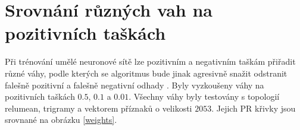 \section{Srovnání různých vah na pozitivních taškách}
Při trénování umělé neuronové sítě lze pozitivním a negativním taškám přiřadit různé váhy, podle kterých se algoritmus bude jinak agresivně snažit odstranit falešně pozitivní a falešně negativní odhady . Byly vyzkoušeny váhy na pozitivních taškách \( 0.5 \), \( 0.1 \) a \( 0.01 \). Všechny váhy byly testovány s topologií relumean, trigramy a vektorem příznaků o velikosti \( 2053 \). Jejich PR křivky jsou srovnané na obrázku \ref{weights}.

